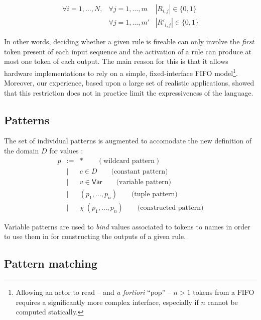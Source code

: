 \begin{eqnarray*}
  \forall i=1,\ldots,N, & \forall j=1,\ldots,m  &|R_{i,j}| \in \{0,1\} \\
                        & \forall j=1,\ldots,m'  &|R'_{i,j}| \in \{0,1\}
\end{eqnarray*}

\medskip
\noindent
In other words, deciding whether a given rule is fireable can only involve the \emph{first} token
present of each input sequence and the activation of a rule can produce at most one token of each
output. The main reason for this is that it allows hardware implementations
to rely on a simple, fixed-interface FIFO model\footnote{Allowing an actor to read -- and \emph{a
    fortiori} ``pop'' -- $n>1$ tokens from a FIFO requires a significantly more complex interface,
  especially if $n$ cannot be computed statically.}. Moreover, our experience, based upon a large
set of realistic applications, showed that this restriction does not in practice limit the
expressiveness of the language.

\subsection{Patterns}
\label{cpn-patterns}

The set of individual patterns is augmented to accomodate the new definition of the domain $D$ for
values :
\begin{eqnarray*}
  p & := & * \qquad (\text{wildcard pattern}) \\
    & |  &  c \in D \qquad \text{(constant pattern)} \\
    & |  & v \in \mathsf{Var} \qquad \text{(variable pattern)} \\
    & |  & (p_1,\ldots,p_n) \qquad \text{(tuple pattern)} \\
    & |  & \chi\ (p_1,\ldots,p_n) \qquad \text{(constructed pattern)}
\end{eqnarray*}

\medskip
\noindent
Variable patterns are used to \emph{bind} values associated to tokens to names in order to use them
in for constructing the outputs of a given rule. 

\subsection{Pattern matching}
\label{cpn-pattern-match}

